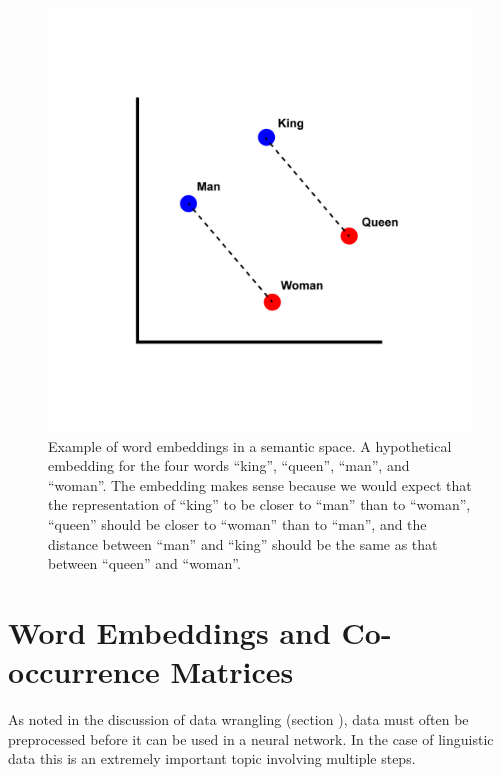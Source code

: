 \begin{figure}[h]
    \centering
    \includegraphics[scale=.2]{./images/Word_vector_illustration.jpg}
    \caption[From \url{https://en.wikipedia.org/wiki/Word2vec\#/media/File:Word_vector_illustration.jpg}.]{Example of word embeddings in a semantic space. A hypothetical embedding for the four words ``king'', ``queen'', ``man'', and ``woman''.  The embedding makes sense because we would expect that the representation of ``king'' to be closer to ``man'' than to ``woman'', ``queen'' should be closer to ``woman'' than to ``man'', and the distance between ``man'' and ``king'' should be the same as that between ``queen'' and ``woman''.    }
 \label{f:kingQueenExample}
\end{figure}


\section{Word Embeddings and Co-occurrence Matrices}

As noted in the discussion of data wrangling (section ), data must often be preprocessed before it can be used in a neural network. In the case of linguistic data this is an extremely important topic involving multiple steps.  

